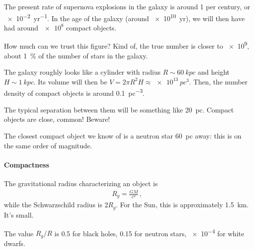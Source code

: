 \documentclass[main.tex]{subfiles}
\begin{document}
The present rate of supernova explosions in the galaxy is around 1 per century, or \SI{e-2}{yr^{-1}}. 
In the age of the galaxy (around \SI{e10}{yr}), we will then have had around \(\num{e8}\) compact objects. 

How much can we trust this figure? Kind of, the true number is closer to \num{e9}, about \SI{1}{\percent} of the number of stars in the galaxy.

The galaxy roughly looks like a cylinder with radius \(R \sim \SI{60}{kpc}\) and height \(H \sim \SI{1}{kpc}\).
Its volume will then be \(V = 2 \pi R^2 H \approx \SI{e13}{pc^{3}}\). Then, the number density of compact objects is around \SI{0.1}{pc^{-3}}.

The typical separation between them will be something like \SI{20}{pc}. Compact objects are close, common! Beware!

The closest compact object we know of is a neutron star \SI{60}{pc} away: this is on the same order of magnitude.

\paragraph{Compactness}
The gravitational radius characterizing an object is 
%
\begin{align}
R_g = \frac{GM}{c^2}
\,,
\end{align}
%
while the Schwarzschild radius is \(2 R_g\). For the Sun, this is approximately \SI{1.5}{km}. It's small.

The value \(R_g / R\) is \num{.5} for black holes, \num{.15} for neutron stars, \num{e-4} for white dwarfs.
\end{document}
